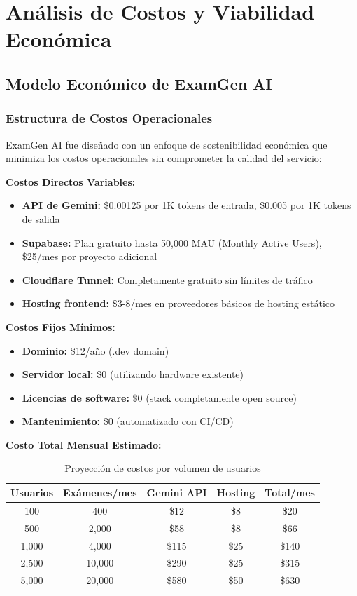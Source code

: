 \documentclass[12pt,a4paper]{report}
\begin{document}
\section{Análisis de Costos y Viabilidad Económica}

\subsection{Modelo Económico de ExamGen AI}

\subsubsection{Estructura de Costos Operacionales}

ExamGen AI fue diseñado con un enfoque de sostenibilidad económica que minimiza los costos operacionales sin comprometer la calidad del servicio:

\textbf{Costos Directos Variables:}
\begin{itemize}
\item \textbf{API de Gemini:} \$0.00125 por 1K tokens de entrada, \$0.005 por 1K tokens de salida
\item \textbf{Supabase:} Plan gratuito hasta 50,000 MAU (Monthly Active Users), \$25/mes por proyecto adicional
\item \textbf{Cloudflare Tunnel:} Completamente gratuito sin límites de tráfico
\item \textbf{Hosting frontend:} \$3-8/mes en proveedores básicos de hosting estático
\end{itemize}

\textbf{Costos Fijos Mínimos:}
\begin{itemize}
\item \textbf{Dominio:} \$12/año (.dev domain)
\item \textbf{Servidor local:} \$0 (utilizando hardware existente)
\item \textbf{Licencias de software:} \$0 (stack completamente open source)
\item \textbf{Mantenimiento:} \$0 (automatizado con CI/CD)
\end{itemize}

\textbf{Costo Total Mensual Estimado:}
\begin{table}[h]
\centering
\caption{Proyección de costos por volumen de usuarios}
\begin{tabular}{|c|c|c|c|c|}
\hline
\textbf{Usuarios} & \textbf{Exámenes/mes} & \textbf{Gemini API} & \textbf{Hosting} & \textbf{Total/mes} \\
\hline
100 & 400 & \$12 & \$8 & \$20 \\
\hline
500 & 2,000 & \$58 & \$8 & \$66 \\
\hline
1,000 & 4,000 & \$115 & \$25 & \$140 \\
\hline
2,500 & 10,000 & \$290 & \$25 & \$315 \\
\hline
5,000 & 20,000 & \$580 & \$50 & \$630 \\
\hline
\end{tabular}
\end{table}
\end{document}
